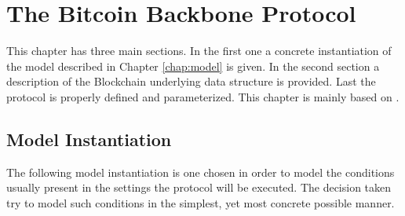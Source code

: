 \documentclass[..]{subfiles}
\begin{document}
\chapter{The Bitcoin Backbone Protocol}\label{chap:protocol}

This chapter has three main sections. In the first one a concrete instantiation of the model described in Chapter \ref{chap:model} is given. In the second section a description of the Blockchain underlying data structure is provided. Last the protocol is properly defined and parameterized. This chapter is mainly based on \cite{garay2015bitcoin}.

\section{Model Instantiation}

The following model instantiation is one chosen in order to model the conditions usually present in the settings the protocol will be executed. The decision taken try to model such conditions in the simplest, yet most concrete possible manner.
\end{document}

